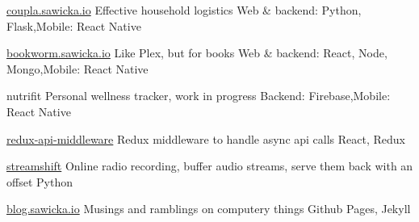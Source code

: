 
\begin{cvprojects}

	\cvproject
		{\href{http://coupla.sawicka.io}{coupla.sawicka.io}}
		{Effective household logistics}
		{Web \& backend: Python, Flask,\newline Mobile: React Native}

	\cvproject
		{\href{http://bookworm.sawicka.io}{bookworm.sawicka.io}}
		{Like Plex, but for books}
		{Web \& backend: React, Node, Mongo,\newline Mobile: React Native}

	\cvproject
		{nutrifit}
		{Personal wellness tracker, work in progress}
		{Backend: Firebase,\newline Mobile: React Native}

	\cvproject
		{\faGithub\acvHeaderIconSep \href{https://github.com/patyk/redux-api-middleware}{redux-api-middleware}}
		{Redux middleware to handle async api calls}
		{React, Redux}

	\cvproject
		{\faGithub\acvHeaderIconSep \href{https://github.com/patyk/streamshift}{streamshift}}
		{Online radio recording, buffer audio streams, serve them back with an offset}
		{Python}

	\cvproject
		{\faGithub\acvHeaderIconSep \href{http://blog.sawicka.io}{blog.sawicka.io}}
		{Musings and ramblings on computery things}
		{Github Pages, Jekyll}

\end{cvprojects}
